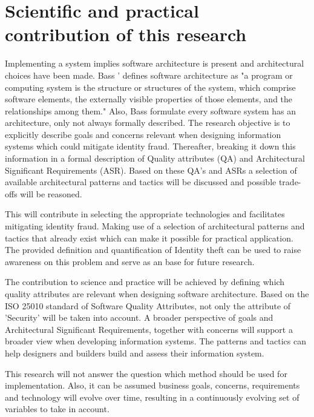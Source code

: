 \section{Scientific and practical contribution of this research}
Implementing a system implies software architecture is present and architectural choices have been made. Bass '\etal \cite{Bass2015SoftwareAI} defines software architecture as "a program or computing system is the structure or structures of the system, which comprise software elements, the externally visible properties of those elements, and the relationships among them." Also, Bass \etal formulate every software system has an architecture, only not always formally described.
The research objective is to explicitly describe goals and concerns relevant when designing information systems which could mitigate identity fraud. Thereafter, breaking it down this information in a formal description of Quality attributes (QA) and Architectural Significant Requirements (ASR). Based on these QA's and ASRs a selection of available architectural patterns and tactics will be discussed and possible trade-offs will be reasoned.

This will contribute in selecting the appropriate technologies and facilitates mitigating identity fraud. Making use of a selection of architectural patterns and tactics that already exist which can make it possible for practical application. The provided definition and quantification of Identity theft can be used to raise awareness on this problem and serve as an base for future research.

The contribution to science and practice will be achieved by defining which quality attributes are relevant when designing software architecture. Based on the ISO 25010 standard of Software Quality Attributes, not only the attribute of 'Security' will be taken into account. A broader perspective of goals and Architectural Significant Requirements, together with concerns will support a broader view when developing information systems. The patterns and tactics can help designers and builders build and assess their information system.

This research will not answer the question which method should be used for implementation. Also, it can be assumed business goals, concerns, requirements and technology will evolve over time, resulting in a continuously evolving set of variables to take in account.



